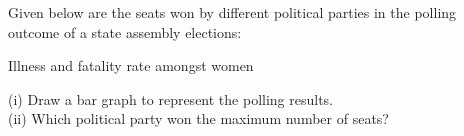 Given below are the seats won by different political parties in the polling outcome of a state assembly elections:\\
\begin{table}[ht!]
\centering

\caption{Illness and fatality rate amongst women}
\label{table:input_39}
\end{table}
(i) Draw a bar graph to represent the polling results.\\
(ii) Which political party won the maximum number of seats?\\
